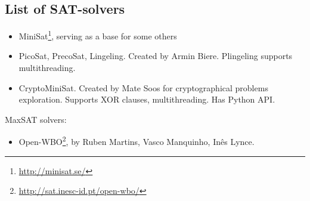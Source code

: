 \subsection{List of SAT-solvers}


\begin{itemize}

\item MiniSat\footnote{\url{http://minisat.se/}}, serving as a base for some others

\item PicoSat, PrecoSat, Lingeling. Created by Armin Biere. Plingeling supports multithreading.

\item CryptoMiniSat. Created by Mate Soos for cryptographical problems exploration.
Supports XOR clauses, multithreading.
Has Python API.

\end{itemize}

MaxSAT solvers:

\begin{itemize}

\item Open-WBO\footnote{\url{http://sat.inesc-id.pt/open-wbo/}}, by Ruben Martins, Vasco Manquinho, Inês Lynce.

\end{itemize}

